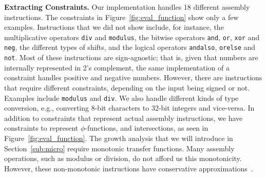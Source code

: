 \documentclass[times]{speauth}
\begin{document}
\noindent
\textbf{Extracting Constraints.}
Our implementation handles 18 different assembly instructions.
The constraints in Figure~\ref{fig:eval_function} show only a few examples.
Instructions that we did not show include, for instance, the multiplicative
operators \texttt{div} and \texttt{modulus},
the bitwise operators \texttt{and}, \texttt{or}, \texttt{xor} and \texttt{neg},
the different types of shifts, and the
logical operators \texttt{andalso}, \texttt{orelse} and \texttt{not}.
Most of these instructions are sign-agnostic; that is, given that numbers are
internally represented in 2's complement, the same implementation of a
constraint handles positive and negative numbers.
However, there are instructions that require different constraints, depending on
the input being signed or not.
Examples include \texttt{modulus} and \texttt{div}.
We also handle different kinds of type conversion, e.g., converting 8-bit
characters to 32-bit integers and vice-versa.
In addition to constraints that represent actual assembly instructions, we have
constraints to represent $\phi$-functions, and intersections, as seen in
Figure~\ref{fig:eval_function}.
The growth analysis that we will introduce in Section~\ref{sub:micro}
require monotonic transfer functions.
Many assembly operations, such as modulus or division, do not afford us
this monotonicity.
However, these non-monotonic instructions have conservative
approximations~\cite{Warren02}.

%
\end{document}
